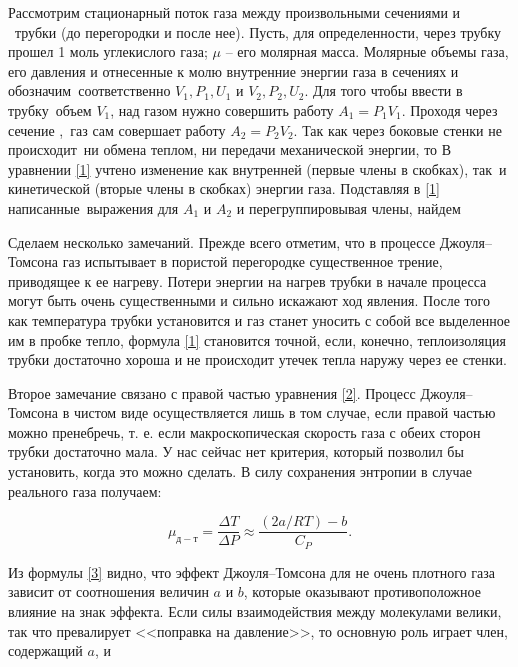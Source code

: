 \documentclass[a4paper, 12pt]{article}
\begin{document}
Рассмотрим стационарный поток газа между произвольными сечениями  и \
трубки (до перегородки и после нее). Пусть, для определенности, через трубку прошел
1 моль углекислого газа; $ \mu $ -- его молярная масса. Молярные объемы газа, его давления
и отнесенные к молю внутренние энергии газа в сечениях \Rnum{1} и  обозначим\
соответственно $ V_1, P_1, U_1 $ и $ V_2, P_2, U_2 $. Для того чтобы ввести в трубку\
объем $ V_1 $, над газом нужно совершить работу $ A_1 = P_1V_1 $. Проходя через сечение \Rnum{2},\
газ сам совершает работу $ A_2 = P_2V_2 $. Так как через боковые стенки не происходит\
ни обмена теплом, ни передачи механической энергии, то
\label{1}
В уравнении \eqref{1} учтено изменение как внутренней (первые члены в скобках), так\
и кинетической (вторые члены в скобках) энергии газа. Подставляя в \eqref{1} написанные\
выражения для $ A_1 $ и $ A_2 $ и перегруппировывая члены, найдем
\label{2}

Сделаем несколько замечаний. Прежде всего отметим, что в процессе Джоуля–Томсона газ испытывает в пористой перегородке существенное трение, приводящее к ее нагреву. Потери энергии на нагрев трубки в начале процесса могут быть очень существенными и сильно искажают ход явления. После того как температура трубки установится и газ станет уносить с собой все выделенное им в пробке тепло, формула \eqref{1} становится точной, если, конечно, теплоизоляция трубки достаточно хороша и не происходит утечек тепла наружу через ее стенки.

Второе замечание связано с правой частью уравнения \eqref{2}. Процесс Джоуля–Томсона в чистом виде осуществляется лишь в том случае, если правой частью можно пренебречь, т. е. если макроскопическая скорость газа с обеих сторон трубки достаточно мала. У нас сейчас нет критерия, который позволил бы установить, когда это можно сделать. В силу сохранения энтропии в случае реального газа получаем:

\begin{equation}\label{3}
\mu_{д-т} = \frac{\Delta T}{\Delta P} \approx \frac{(2a/RT) - b}{C_P}.
\end{equation}

Из формулы \eqref{3} видно, что эффект Джоуля–Томсона для не очень плотного газа зависит от соотношения величин $ a $ и $ b $, которые оказывают противоположное влияние на знак эффекта. Если силы взаимодействия между молекулами велики, так что превалирует <<поправка на давление>>, то основную роль играет член, содержащий $ a $, и 
\end{document}
